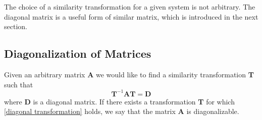 \documentclass[conference,12pt,onecolumn,compsoc]{IEEEtran}
\begin{document}
The choice of a similarity transformation for a given system is not arbitrary. The diagonal matrix is a useful form of similar matrix, which is introduced in the next section.

\subsection{Diagonalization of Matrices}
\label{section: Diagonalization of Matrices}

Given an arbitrary matrix \textbf{A} we would like to find a similarity transformation \textbf{T} such that
\begin{equation}
\textbf{T}^{-1}\textbf{AT} = \textbf{D}
\label{diagonal transformation}
\end{equation}
where \textbf{D} is a diagonal matrix. If there exists a transformation \textbf{T} for which \eqref{diagonal transformation} holds, we say that the matrix \textbf{A} is diagonalizable. 
\end{document}
